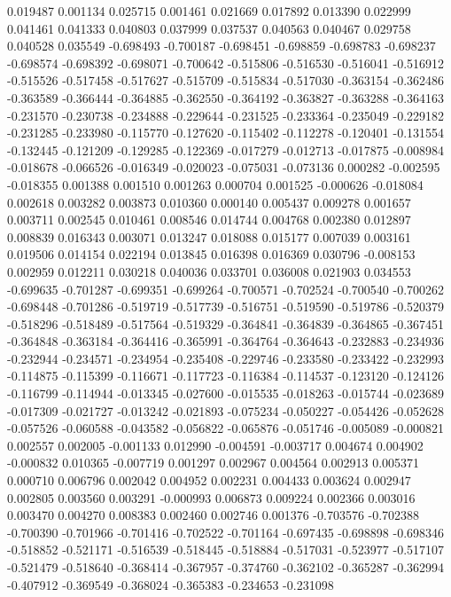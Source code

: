 0.019487
0.001134
0.025715
0.001461
0.021669
0.017892
0.013390
0.022999
0.041461
0.041333
0.040803
0.037999
0.037537
0.040563
0.040467
0.029758
0.040528
0.035549
-0.698493
-0.700187
-0.698451
-0.698859
-0.698783
-0.698237
-0.698574
-0.698392
-0.698071
-0.700642
-0.515806
-0.516530
-0.516041
-0.516912
-0.515526
-0.517458
-0.517627
-0.515709
-0.515834
-0.517030
-0.363154
-0.362486
-0.363589
-0.366444
-0.364885
-0.362550
-0.364192
-0.363827
-0.363288
-0.364163
-0.231570
-0.230738
-0.234888
-0.229644
-0.231525
-0.233364
-0.235049
-0.229182
-0.231285
-0.233980
-0.115770
-0.127620
-0.115402
-0.112278
-0.120401
-0.131554
-0.132445
-0.121209
-0.129285
-0.122369
-0.017279
-0.012713
-0.017875
-0.008984
-0.018678
-0.066526
-0.016349
-0.020023
-0.075031
-0.073136
0.000282
-0.002595
-0.018355
0.001388
0.001510
0.001263
0.000704
0.001525
-0.000626
-0.018084
0.002618
0.003282
0.003873
0.010360
0.000140
0.005437
0.009278
0.001657
0.003711
0.002545
0.010461
0.008546
0.014744
0.004768
0.002380
0.012897
0.008839
0.016343
0.003071
0.013247
0.018088
0.015177
0.007039
0.003161
0.019506
0.014154
0.022194
0.013845
0.016398
0.016369
0.030796
-0.008153
0.002959
0.012211
0.030218
0.040036
0.033701
0.036008
0.021903
0.034553
-0.699635
-0.701287
-0.699351
-0.699264
-0.700571
-0.702524
-0.700540
-0.700262
-0.698448
-0.701286
-0.519719
-0.517739
-0.516751
-0.519590
-0.519786
-0.520379
-0.518296
-0.518489
-0.517564
-0.519329
-0.364841
-0.364839
-0.364865
-0.367451
-0.364848
-0.363184
-0.364416
-0.365991
-0.364764
-0.364643
-0.232883
-0.234936
-0.232944
-0.234571
-0.234954
-0.235408
-0.229746
-0.233580
-0.233422
-0.232993
-0.114875
-0.115399
-0.116671
-0.117723
-0.116384
-0.114537
-0.123120
-0.124126
-0.116799
-0.114944
-0.013345
-0.027600
-0.015535
-0.018263
-0.015744
-0.023689
-0.017309
-0.021727
-0.013242
-0.021893
-0.075234
-0.050227
-0.054426
-0.052628
-0.057526
-0.060588
-0.043582
-0.056822
-0.065876
-0.051746
-0.005089
-0.000821
0.002557
0.002005
-0.001133
0.012990
-0.004591
-0.003717
0.004674
0.004902
-0.000832
0.010365
-0.007719
0.001297
0.002967
0.004564
0.002913
0.005371
0.000710
0.006796
0.002042
0.004952
0.002231
0.004433
0.003624
0.002947
0.002805
0.003560
0.003291
-0.000993
0.006873
0.009224
0.002366
0.003016
0.003470
0.004270
0.008383
0.002460
0.002746
0.001376
-0.703576
-0.702388
-0.700390
-0.701966
-0.701416
-0.702522
-0.701164
-0.697435
-0.698898
-0.698346
-0.518852
-0.521171
-0.516539
-0.518445
-0.518884
-0.517031
-0.523977
-0.517107
-0.521479
-0.518640
-0.368414
-0.367957
-0.374760
-0.362102
-0.365287
-0.362994
-0.407912
-0.369549
-0.368024
-0.365383
-0.234653
-0.231098
